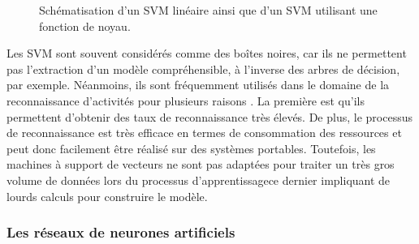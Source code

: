 \begin{figure}[H]
	\centering
	\hspace*{\fill}
	\caption{Schématisation d'un SVM linéaire ainsi que d'un SVM utilisant une fonction de noyau.}
\end{figure}

Les \acs{SVM} sont souvent considérés comme des boîtes noires, car ils ne permettent pas l'extraction d'un modèle compréhensible, à l'inverse des arbres de décision, par exemple. Néanmoins, ils sont fréquemment utilisés dans le domaine de la reconnaissance d'activités pour plusieurs raisons \citep{He2009, Anguita2012}. La première est qu'ils permettent d'obtenir des taux de reconnaissance très élevés. De plus, le processus de reconnaissance est très efficace en termes de consommation des ressources et peut donc facilement être réalisé sur des systèmes portables. Toutefois, les machines à support de vecteurs ne sont pas adaptées pour traiter un très gros volume de données lors du processus d'apprentissage\textemdash ce dernier impliquant de lourds calculs pour construire le modèle.

\subsubsection{Les réseaux de neurones artificiels}

